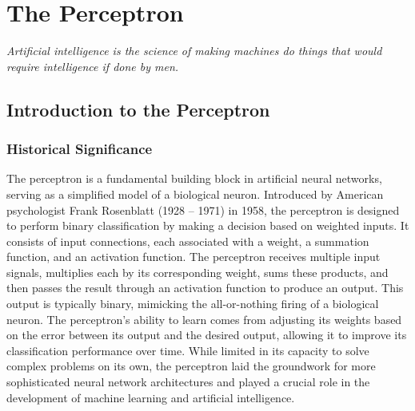 \chapter{The Perceptron}

\epigraph{\textit{Artificial intelligence is the science of making machines do things that would require intelligence if done by men.}}{}

\minitoc
\newpage
\section{Introduction to the Perceptron}
\subsection{Historical Significance}
The perceptron is a fundamental building block in artificial neural networks, serving as a simplified model of a biological neuron. Introduced by American psychologist Frank Rosenblatt (1928 – 1971) in 1958, the perceptron is designed to perform binary classification by making a decision based on weighted inputs. It consists of input connections, each associated with a weight, a summation function, and an activation function. The perceptron receives multiple input signals, multiplies each by its corresponding weight, sums these products, and then passes the result through an activation function to produce an output. This output is typically binary, mimicking the all-or-nothing firing of a biological neuron. The perceptron's ability to learn comes from adjusting its weights based on the error between its output and the desired output, allowing it to improve its classification performance over time. While limited in its capacity to solve complex problems on its own, the perceptron laid the groundwork for more sophisticated neural network architectures and played a crucial role in the development of machine learning and artificial intelligence.

